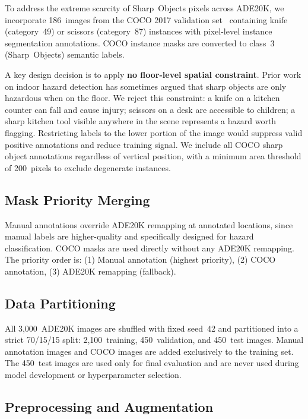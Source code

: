 To address the extreme scarcity of Sharp~Objects pixels across
ADE20K, we incorporate 186~images from the COCO 2017 validation
set~\cite{lin2014coco} containing knife (category~49) or scissors
(category~87) instances with pixel-level instance segmentation
annotations. COCO instance masks are converted to class~3
(Sharp~Objects) semantic labels.

A key design decision is to apply \textbf{no floor-level spatial
constraint}. Prior work on indoor hazard detection has sometimes
argued that sharp objects are only hazardous when on the floor.
We reject this constraint: a knife on a kitchen counter can fall
and cause injury; scissors on a desk are accessible to children;
a sharp kitchen tool visible anywhere in the scene represents a
hazard worth flagging. Restricting labels to the lower portion
of the image would suppress valid positive annotations and
reduce training signal. We include all COCO sharp object
annotations regardless of vertical position, with a minimum
area threshold of 200~pixels to exclude degenerate instances.

\subsection{Mask Priority Merging}

Manual annotations override ADE20K remapping at annotated locations,
since manual labels are higher-quality and specifically designed for
hazard classification. COCO masks are used directly without any
ADE20K remapping. The priority order is:
(1) Manual annotation (highest priority),
(2) COCO annotation, (3) ADE20K remapping (fallback).

\subsection{Data Partitioning}

All 3,000~ADE20K images are shuffled with fixed seed~42 and
partitioned into a strict 70/15/15 split: 2,100~training,
450~validation, and 450~test images. Manual annotation images
and COCO images are added exclusively to the training set.
The 450~test images are used only for final evaluation and
are never used during model development or hyperparameter selection.

\subsection{Preprocessing and Augmentation}

